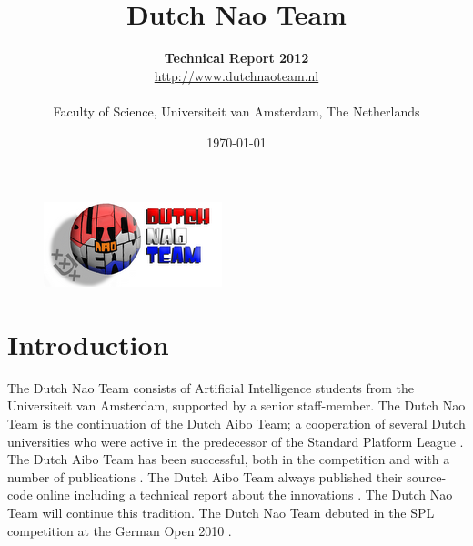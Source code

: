 \documentclass[11pt,a4paper,oneside]{article}
\begin{document}
\title{\textbf{Dutch Nao Team}}
\author{\textbf{Technical Report 2012}\\ 
\url{http://www.dutchnaoteam.nl}\\\\
Faculty of Science, Universiteit van Amsterdam, The Netherlands}
\date{\today}
\maketitle

\begin{figure}[htb]    	
\centering
{}
\label{fig:TeamPhoto}
\end{figure}

\begin{figure}[htb]    	
\centering
\includegraphics[width=0.3\columnwidth]{DNTLogo.png} %
\label{fig:DNTLogo}
\end{figure}

\newpage
\tableofcontents
\newpage
\section{Introduction}
The Dutch Nao Team consists of Artificial Intelligence students from the Universiteit van Amsterdam, supported by a senior staff-member. The Dutch Nao Team is the continuation of the Dutch Aibo Team; a cooperation of several Dutch universities who were active in the predecessor of the Standard Platform League \cite{AIBOTeam2006, AIBOTeam2005, AIBOTeam2004}. The Dutch Aibo Team has been successful, both in the competition and with a number of publications \cite{ArnoudJurgen2009, RoboticDog2008, Panoramic2007, ColorLearning2006, Localization2006, Perception2005}.
The Dutch Aibo Team always published their source-code online including a technical report about the innovations \cite{Visser2006}.
The Dutch Nao Team will continue this tradition. The Dutch Nao Team debuted in the SPL competition at the German Open 2010 \cite{DutchNaoTeamTDP2010}.\\
\end{document}
